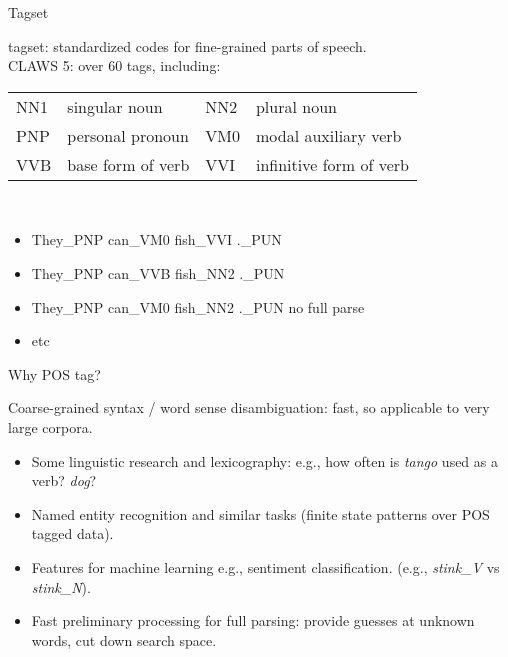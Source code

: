 \documentclass{beamer}
\newcommand{\newterm}[1]{{\alert{#1}}}
\begin{document}
\begin{frame}{Tagset}

\newterm{tagset}: standardized codes for fine-grained parts of speech.\\  
CLAWS 5: over 60 tags, including:\\[0.1in]
\begin{tabular}{ll | ll}
NN1 & singular noun & NN2 & plural noun\\
PNP & personal pronoun & VM0 & modal auxiliary verb\\
VVB & base form of verb & VVI & infinitive form of verb
\end{tabular}\\[0.1in]

\begin{itemize}
\item They\_PNP can\_VM0 fish\_VVI .\_PUN 
\item They\_PNP can\_VVB fish\_NN2 .\_PUN
\item They\_PNP can\_VM0 fish\_NN2 .\_PUN \alert{  no full parse}
\item etc
\end{itemize}

\end{frame}

\begin{frame}{Why POS tag?}

Coarse-grained syntax / word sense disambiguation:
fast, so applicable to very large corpora.
\begin{itemize}
\item Some linguistic research and lexicography: e.g.,
how often is {\it tango} used as a verb? {\it dog}?
\item Named entity recognition and similar tasks 
(finite state patterns over POS tagged data).
\item Features for machine learning e.g., sentiment classification.
(e.g., {\it stink\_V}\/ vs {\it stink\_N}\/).
\item Fast preliminary processing for full parsing: provide guesses at unknown words,
cut down search space.
\end{itemize}

\end{frame}
\end{document}
